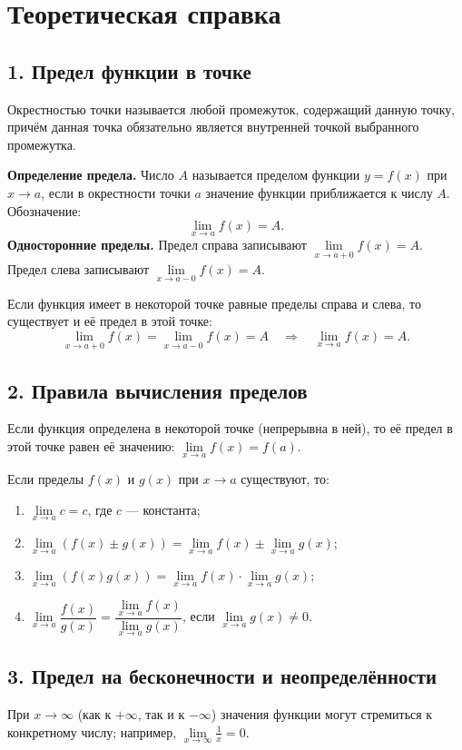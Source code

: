 \section*{Теоретическая справка}

\subsection*{1. Предел функции в точке}
Окрестностью точки называется любой промежуток, содержащий данную точку, причём данная точка обязательно является внутренней точкой выбранного промежутка.

\begin{exercise}
\textbf{Определение предела.} Число $A$ называется пределом функции $y=f(x)$ при $x\to a$, если в окрестности точки $a$ значение функции приближается к числу $A$. Обозначение:
\[
  \lim\limits_{x\to a} f(x)=A.
\]
\textbf{Односторонние пределы.} Предел справа записывают $\lim\limits_{x\to a+0}f(x)=A$.
Предел слева записывают $\lim\limits_{x\to a-0}f(x)=A$.

Если функция имеет в некоторой точке равные пределы справа и слева, то существует и её предел в этой точке:
\[
\lim\limits_{x\to a+0}f(x)=\lim\limits_{x\to a-0}f(x)=A
\quad\Longrightarrow\quad
\lim\limits_{x\to a}f(x)=A.
\]
\end{exercise}

\subsection*{2. Правила вычисления пределов}
Если функция определена в некоторой точке (непрерывна в ней), то её предел в этой точке равен её значению: $\lim\limits_{x\to a}f(x)=f(a)$.

Если пределы $f(x)$ и $g(x)$ при $x\to a$ существуют, то:
\begin{enumerate}
  \item $\lim\limits_{x\to a}c=c$, где $c$ --- константа;
  \item $\lim\limits_{x\to a}(f(x)\pm g(x))=\lim\limits_{x\to a}f(x)\pm\lim\limits_{x\to a}g(x)$;
  \item $\lim\limits_{x\to a}(f(x)g(x))=\lim\limits_{x\to a}f(x)\cdot\lim\limits_{x\to a}g(x)$;
  \item $\lim\limits_{x\to a}\dfrac{f(x)}{g(x)}=\dfrac{\lim\limits_{x\to a}f(x)}{\lim\limits_{x\to a}g(x)}$, если $\lim\limits_{x\to a}g(x)\ne0$.
\end{enumerate}

\subsection*{3. Предел на бесконечности и неопределённости}
При $x\to\infty$ (как к $+\infty$, так и к $-\infty$) значения функции могут стремиться к конкретному числу; например, $\lim\limits_{x\to\infty}\frac1x=0$.


